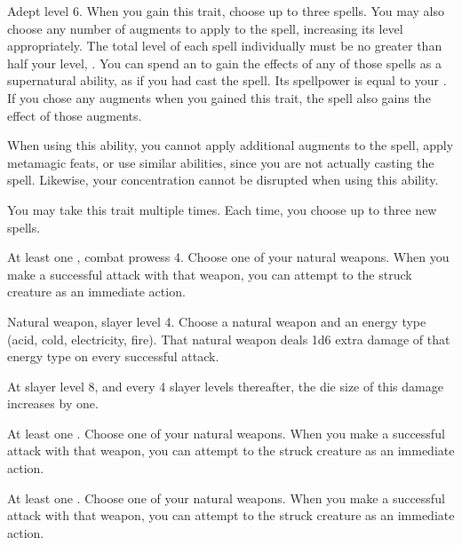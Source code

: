     \featpre Adept level 6.
    \featben When you gain this trait, choose up to three spells.
    You may also choose any number of augments to apply to the spell, increasing its level appropriately.
    The total level of each spell individually must be no greater than half your level, .
    You can spend an  to gain the effects of any of those spells as a supernatural ability, as if you had cast the spell.
    Its spellpower is equal to your .
    If you chose any augments when you gained this trait, the spell also gains the effect of those augments.

    When using this ability, you cannot apply additional augments to the spell, apply metamagic feats, or use similar abilities, since you are not actually casting the spell.
    Likewise, your concentration cannot be disrupted when using this ability.

     You may take this trait multiple times.
    Each time, you choose up to three new spells.

    \featpre At least one , combat prowess 4.
    \featben Choose one of your natural weapons.
    When you make a successful attack with that weapon, you can attempt to  the struck creature as an immediate action.

    \featpre Natural weapon, slayer level 4.
    \featben Choose a natural weapon and an energy type (acid, cold, electricity, fire).
    That natural weapon deals 1d6 extra damage of that energy type on every successful attack.

    At slayer level 8, and every 4 slayer levels thereafter, the die size of this damage increases by one.

    \featpre At least one .
    \featben Choose one of your natural weapons.
    When you make a successful attack with that weapon, you can attempt to  the struck creature as an immediate action.

    \featpre At least one .
    \featben Choose one of your natural weapons.
    When you make a successful attack with that weapon, you can attempt to  the struck creature as an immediate action.

